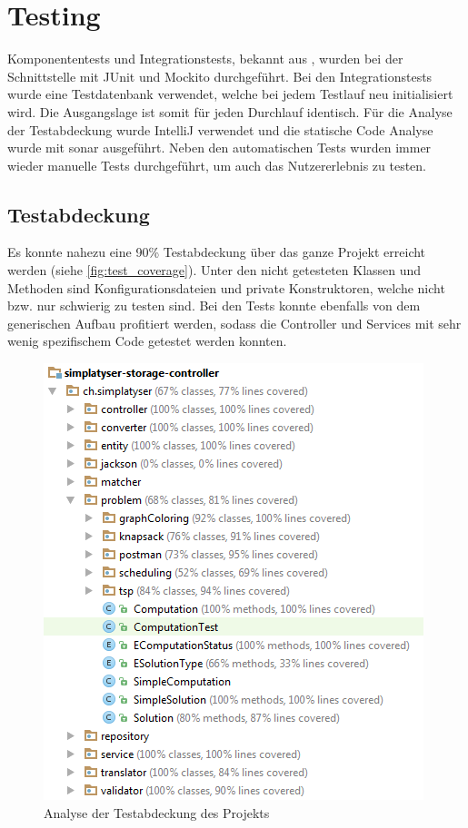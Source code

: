 \section{Testing}
Komponententests und Integrationstests, bekannt aus \cite{test_soft_book}, wurden bei der Schnittstelle mit JUnit und Mockito durchgeführt. Bei den Integrationstests wurde eine 
Testdatenbank verwendet, welche bei jedem Testlauf neu initialisiert wird. Die Ausgangslage ist somit für jeden Durchlauf identisch. Für die Analyse der Testabdeckung wurde IntelliJ 
verwendet und die statische Code Analyse wurde mit \gls{sonar} ausgeführt. Neben den automatischen Tests wurden immer wieder manuelle Tests durchgeführt, um auch das Nutzererlebnis 
zu testen.

\subsection{Testabdeckung}
Es konnte nahezu eine 90\% Testabdeckung über das ganze Projekt erreicht werden (siehe \autoref{fig:test_coverage}). Unter den nicht getesteten Klassen und Methoden sind 
Konfigurationsdateien und private Konstruktoren, welche nicht bzw. nur schwierig zu testen sind. Bei den Tests konnte ebenfalls von dem generischen Aufbau profitiert werden, sodass die 
Controller und Services mit sehr wenig spezifischem Code getestet werden konnten.

\begin{figure}[h]
\centering
\includegraphics[scale=0.74]{images/test_coverage.png}
\caption[Analyse der Testabdeckung des Projekts]{Analyse der Testabdeckung des Projekts \selfmade{}}
\label{fig:test_coverage}
\end{figure}

